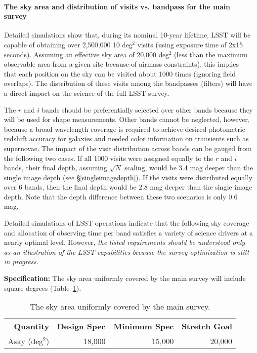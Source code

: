 \paragraph{The sky area and distribution of visits vs. bandpass for the main survey\\}
\label{VvsB}

Detailed simulations show that, during its nominal 10-year  lifetime,
LSST will be capable of obtaining over 2,500,000 10 deg$^2$ visits
(using exposure time of 2x15 seconds).
Assuming an effective sky area of 20,000 deg$^2$ (less than the maximum
observable area from a given site because of airmass constraints), this
implies that each position on the sky can be visited about 1000 times
(ignoring field overlaps).  The distribution of these visits among the
bandpasses (filters) will have a direct impact on the science of the full
LSST survey.

The $r$ and $i$ bands should be preferentially selected over other bands
because they will be used for shape measurements. Other bands cannot
be neglected, however, because a broad wavelength coverage is required to achieve
desired photometric redshift accuracy for galaxies and needed color
information on transients such as supernovae. The impact of the visit
distribution across bands can be gauged from the following two cases. If
all 1000 visits were assigned equally to the $r$ and $i$ bands, their
final depth, assuming $\sqrt{N}$ scaling, would be 3.4 mag deeper than the
single image depth (see \S \ref{singleimagedepth}). If the visits were
distributed equally over 6 bands, then the final depth would be 2.8 mag
deeper than the single image depth. Note that the depth difference between
these two scenarios is only 0.6 mag.

Detailed simulations of LSST operations indicate that the following sky coverage and
allocation of observing time per band satisfies a variety of science drivers at a
nearly optimal level. However, {\it the listed requirements should be
understood only as an illustration of the LSST capabilities because
the survey optimization is still in progress.}


{\bf Specification:} The sky area uniformly covered by the main
survey will include
square degrees (Table~\ref{TskyArea}).

\begin{table}[h]
\begin{tabular}{|r|r|r|r|}
\hline
 Quantity            & Design Spec & Minimum Spec & Stretch Goal     \\
\hline
 Asky  (deg$^2$)   &  18,000      &  15,000       &  20,000        \\
\hline
\end{tabular}
\caption{The sky area uniformly covered by the main survey.}
\label{TskyArea}
\end{table}

